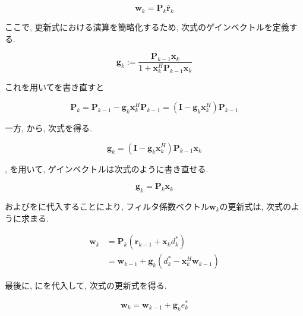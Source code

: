 \begin{equation}
\bm{w}_k = \bm{P}_k \hat{\bm{r}}_k
\label{equ:w_simple_rls}
\end{equation}


ここで, 更新式における演算を簡略化するため, 次式のゲインベクトルを定義する. 

\begin{equation}
\bm{g}_k := \frac{\bm{P}_{k-1} \bm{x}_k}{1 + \bm{x}_k^H \bm{P}_{k-1} \bm{x}_k}
\label{equ:g_k_complex}
\end{equation}

これを用いてを書き直すと


\begin{equation}
\bm{P}_k = \bm{P}_{k-1} - \bm{g}_k \bm{x}_k^H \bm{P}_{k-1} = (\bm{I} - \bm{g}_k \bm{x}_k^H) \bm{P}_{k-1}
\label{equ:P_k_flat}
\end{equation}

一方, から, 次式を得る. 

\begin{equation}
\bm{g}_k = (\bm{I} - \bm{g}_k \bm{x}_k^H) \bm{P}_{k-1} \bm{x}_k
\label{equ:g_k_flat}
\end{equation}


, を用いて, ゲインベクトルは次式のように書き直せる. 


\begin{equation}
\bm{g}_k = \bm{P}_k \bm{x}_k
\label{equ:g_k_simple}
\end{equation}


およびをに代入することにより, フィルタ係数ベクトル\(\bm{w}_k\)の更新式は, 次式のように求まる. 

\begin{equation}
\begin{split}
\bm{w}_k &= \bm{P}_k (\hat{\bm{r}}_{k-1} + \bm{x}_k d_k^*) \\
         &= \bm{w}_{k-1} + \bm{g}_k (d_k^* - \bm{x}_k^H \bm{w}_{k-1})
\end{split}
\label{equ:w_k_complex}
\end{equation}


最後に, にを代入して, 次式の更新式を得る. 

\begin{equation}
\bm{w}_k = \bm{w}_{k-1} + \bm{g}_k e_k^*
\end{equation}


